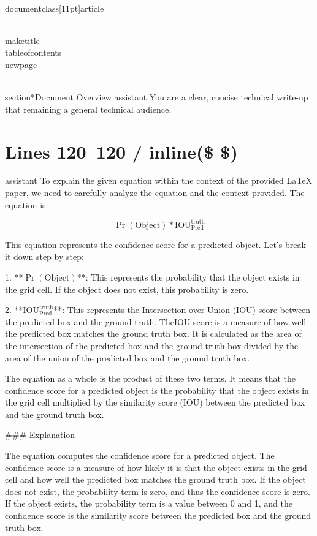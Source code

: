 \\documentclass[11pt]{article}
\begin{document}
\\maketitle
\\tableofcontents
\\newpage

\\section*{Document Overview}
assistant
You are a clear, concise technical write-up that remaining a general technical audience.

\newpage

\section*{Lines 120–120 / inline(\$ \$) }
assistant
To explain the given equation within the context of the provided LaTeX paper, we need to carefully analyze the equation and the context provided. The equation is:

\[
\Pr(\textrm{Object}) * \textrm{IOU}_{\textrm{Pred}}^{\textrm{truth}}
\]

This equation represents the confidence score for a predicted object. Let's break it down step by step:

1. **\(\Pr(\textrm{Object})\)**: This represents the probability that the object exists in the grid cell. If the object does not exist, this probability is zero.

2. **\(\textrm{IOU}_{\textrm{Pred}}^{\textrm{truth}}\)**: This represents the Intersection over Union (IOU) score between the predicted box and the ground truth. TheIOU score is a measure of how well the predicted box matches the ground truth box. It is calculated as the area of the intersection of the predicted box and the ground truth box divided by the area of the union of the predicted box and the ground truth box.

The equation as a whole is the product of these two terms. It means that the confidence score for a predicted object is the probability that the object exists in the grid cell multiplied by the similarity score (IOU) between the predicted box and the ground truth box.

### Explanation

The equation computes the confidence score for a predicted object. The confidence score is a measure of how likely it is that the object exists in the grid cell and how well the predicted box matches the ground truth box. If the object does not exist, the probability term is zero, and thus the confidence score is zero. If the object exists, the probability term is a value between 0 and 1, and the confidence score is the similarity score between the predicted box and the ground truth box.
\end{document}
